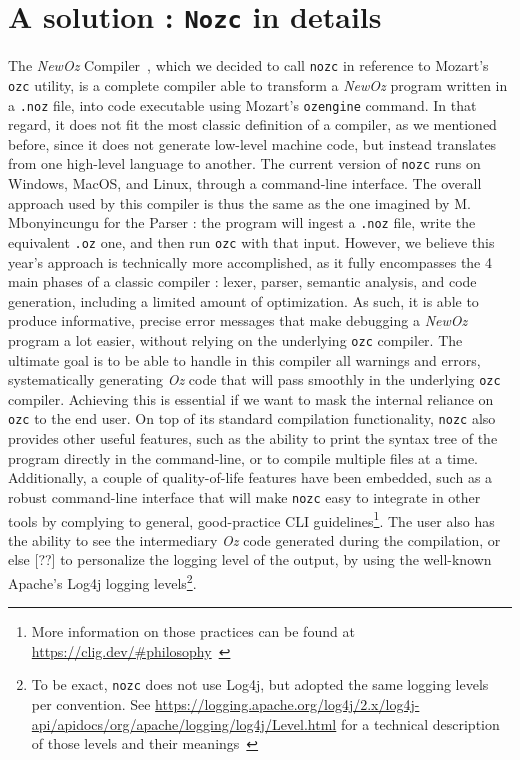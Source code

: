 \section{A solution : \texttt{Nozc} in details}\label{sec:ch3-nozc}
The \textit{NewOz} Compiler~\cite{NozcGitHub}, which we decided to call \texttt{nozc} in reference to Mozart's \texttt{ozc} utility, is a complete compiler able to transform a \textit{NewOz} program written in a \texttt{.noz} file, into code executable using Mozart's \texttt{ozengine} command.
In that regard, it does not fit the most classic definition of a compiler, as we mentioned before, since it does not generate low-level machine code, but instead translates from one high-level language to another.
The current version of \texttt{nozc} runs on Windows, MacOS, and Linux, through a command-line interface.\newline
The overall approach used by this compiler is thus the same as the one imagined by M. Mbonyincungu for the Parser : the program will ingest a \texttt{.noz} file, write the equivalent \texttt{.oz} one, and then run \texttt{ozc} with that input.
However, we believe this year's approach is technically more accomplished, as it fully encompasses the 4 main phases of a classic compiler : lexer, parser, semantic analysis, and code generation, including a limited amount of optimization.
As such, it is able to produce informative, precise error messages that make debugging a \textit{NewOz} program a lot easier, without relying on the underlying \texttt{ozc} compiler.
The ultimate goal is to be able to handle in this compiler all warnings and errors, systematically generating \textit{Oz} code that will pass smoothly in the underlying \texttt{ozc} compiler.
Achieving this is essential if we want to mask the internal reliance on \texttt{ozc} to the end user.\newline
On top of its standard compilation functionality, \texttt{nozc} also provides other useful features, such as the ability to print the syntax tree of the program directly in the command-line, or to compile multiple files at a time.
Additionally, a couple of quality-of-life features have been embedded, such as a robust command-line interface that will make \texttt{nozc} easy to integrate in other tools by complying to general, good-practice CLI guidelines\footnote{More information on those practices can be found at \url{https://clig.dev/\#philosophy}~\cite{clig}}.
The user also has the ability to see the intermediary \textit{Oz} code generated during the compilation, or else [??] to personalize the logging level of the output, by using the well-known Apache's Log4j logging levels\footnote{To be exact, \texttt{nozc} does not use Log4j, but adopted the same logging levels per convention. See \url{https://logging.apache.org/log4j/2.x/log4j-api/apidocs/org/apache/logging/log4j/Level.html} for a technical description of those levels and their meanings~\cite{log4j}}.\newline


